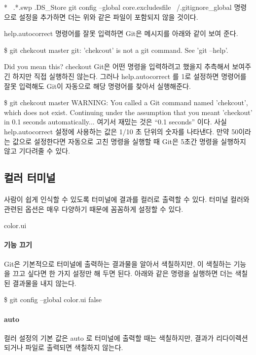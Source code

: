 \documentclass[12pt, a4paper, oneside]{book}
\begin{document}
*~
.*.swp
.DS\_Store
git config --global core.excludesfile ~/.gitignore\_global 명령으로 설정을 추가하면 더는 위와 같은 파일이 포함되지 않을 것이다.

help.autocorrect
명령어를 잘못 입력하면 Git은 메시지를 아래와 같이 보여 준다.

\$ git chekcout master
git: 'chekcout' is not a git command. See 'git --help'.

Did you mean this?
    checkout
Git은 어떤 명령을 입력하려고 했을지 추측해서 보여주긴 하지만 직접 실행하진 않는다. 그러나 help.autocorrect 를 1로 설정하면 명령어를 잘못 입력해도 Git이 자동으로 해당 명령어를 찾아서 실행해준다.

\$ git chekcout master
WARNING: You called a Git command named 'chekcout', which does not exist.
Continuing under the assumption that you meant 'checkout'
in 0.1 seconds automatically...
여기서 재밌는 것은 “0.1 seconds” 이다. 사실 help.autocorrect 설정에 사용하는 값은 1/10 초 단위의 숫자를 나타낸다. 만약 50이라는 값으로 설정한다면 자동으로 고친 명령을 실행할 때 Git은 5초간 명령을 실행하지 않고 기다려줄 수 있다.

\subsection{컬러 터미널}

\paragraph{}
사람이 쉽게 인식할 수 있도록 터미널에 결과를 컬러로 출력할 수 있다. 
터미널 컬러와 관련된 옵션은 매우 다양하기 때문에 꼼꼼하게 설정할 수 있다.

color.ui

\paragraph{기능 끄기}
Git은 기본적으로 터미널에 출력하는 결과물을 알아서 색칠하지만, 이 색칠하는 기능을 끄고 싶다면 한 가지 설정만 해 두면 된다. 
아래와 같은 명령을 실행하면 더는 색칠된 결과물을 내지 않는다.

\$ git config --global color.ui false

\paragraph{auto}
컬러 설정의 기본 값은 auto 로 터미널에 출력할 때는 색칠하지만, 결과가 리다이렉션되거나 파일로 출력되면 색칠하지 않는다.
\end{document}
